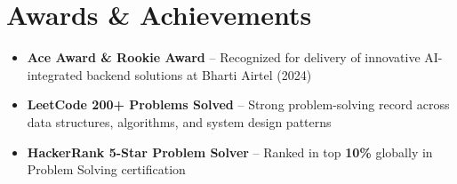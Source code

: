 \documentclass[letterpaper,11pt]{article}
\begin{document}
\section{Awards \& Achievements}
\begin{itemize}[leftmargin=0.15in]
  \item \small{\textbf{Ace Award \& Rookie Award} -- Recognized for delivery of innovative AI-integrated backend solutions at Bharti Airtel (2024)}
  \item \small{\textbf{LeetCode \textbf{200+} Problems Solved} -- Strong problem-solving record across data structures, algorithms, and system design patterns}
  \item \small{\textbf{HackerRank 5-Star Problem Solver} -- Ranked in top \textbf{10\%} globally in Problem Solving certification}
\end{itemize}
\end{document}
